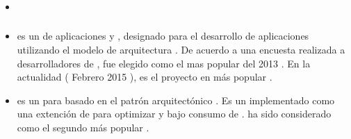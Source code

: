 	\subsubsection{\frameworksPC}
		\begin{itemize}

			\item \textbf{\cakephpNAME}
			\item
				\textbf{\laravelNAME} es un \frameworkPC de aplicaciones \webINT \phpNAME \freePC y \openSourcePC, designado para el desarrollo de aplicaciones \webINT utilizando el modelo de arquitectura \mvcAS. De acuerdo a una encuesta realizada a desarrolladores de \phpNAME, \laravelNAME fue elegido como el \frameworkPC \phpNAME mas popular del 2013 \cite{online_sitepoint_best_php_frameworks_2014}. En la actualidad ( Febrero 2015 ), \laravelNAME es el proyecto \phpNAME en \gitHubNAME más popular \cite{online_popularity_php_proyects}.
			\item
				\textbf{\phalconNAME} es un \frameworkPC \webINT para \phpNAME \highPerformanceQA basado en el patrón arquitectónico \mvcAS. Es un \frameworkPC \openSourcePC implementado como una extención de \cNAME para optimizar \performanceQA y bajo consumo de \resourcesCPT \cite{online_technology_officialsite_phalcon}. \phalconNAME ha sido considerado como el segundo \frameworkPC \phpNAME más popular \cite{online_popularity_php_proyects}.


\end{itemize}
